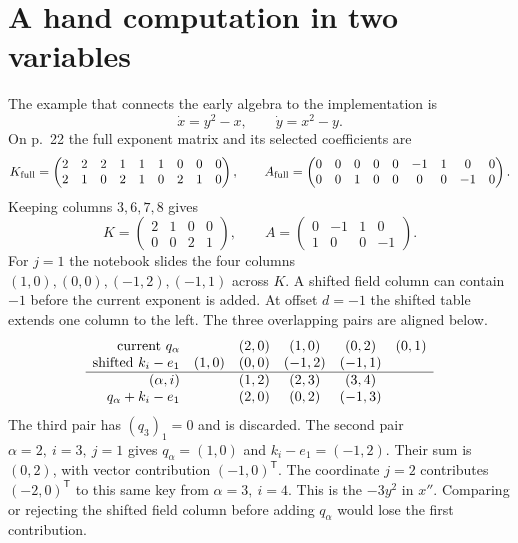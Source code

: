 \documentclass[11pt,letterpaper]{article}
\begin{document}
\section{A hand computation in two variables}\label{sec:example}
The example that connects the early algebra to the implementation is
\begin{equation}\label{eq:xy}
 \dot x=y^2-x,\qquad \dot y=x^2-y .
\end{equation}
On p.~22 the full exponent matrix and its selected coefficients are
\[
 K_{\rm full}=
 \begin{pmatrix}2&2&2&1&1&1&0&0&0\\2&1&0&2&1&0&2&1&0\end{pmatrix},
 \qquad
 A_{\rm full}=
 \begin{pmatrix}0&0&0&0&0&-1&1&0&0\\0&0&1&0&0&0&0&-1&0\end{pmatrix}.
\]
Keeping columns \(3,6,7,8\) gives
\begin{equation}\label{eq:xy1}
 K=\begin{pmatrix}2&1&0&0\\0&0&2&1\end{pmatrix},\qquad
 A=\begin{pmatrix}0&-1&1&0\\1&0&0&-1\end{pmatrix}.
\end{equation}
For \(j=1\) the notebook slides the four columns
\((1,0),(0,0),(-1,2),(-1,1)\) across \(K\). A shifted field column can
contain \(-1\) before the current exponent is added. At offset \(d=-1\) the shifted table extends one column to the left. The
three overlapping pairs are aligned below.
\[
 \begin{array}{r@{\quad}ccccc}
  \text{current } q_\alpha & & (2,0) & (1,0) & (0,2) & (0,1)\\
  \text{shifted } k_i-e_1  & (1,0) & (0,0) & (-1,2) & (-1,1) & \\
  \hline
  (\alpha,i) & & (1,2) & (2,3) & (3,4) &\\
  q_\alpha+k_i-e_1 & & (2,0) & (0,2) & (-1,3) &
 \end{array}
\]
The third pair has \((q_3)_1=0\) and is discarded. The second pair
\(\alpha=2,\ i=3,\ j=1\) gives \(q_\alpha=(1,0)\) and
\(k_i-e_1=(-1,2)\). Their sum is \((0,2)\), with vector contribution
\((-1,0)^\mathsf{T}\). The coordinate \(j=2\) contributes
\((-2,0)^\mathsf{T}\) to this same key from \(\alpha=3,\ i=4\). This is
the \(-3y^2\) in \(x''\). Comparing or rejecting the shifted field column
before adding \(q_\alpha\) would lose the first contribution.
\end{document}
